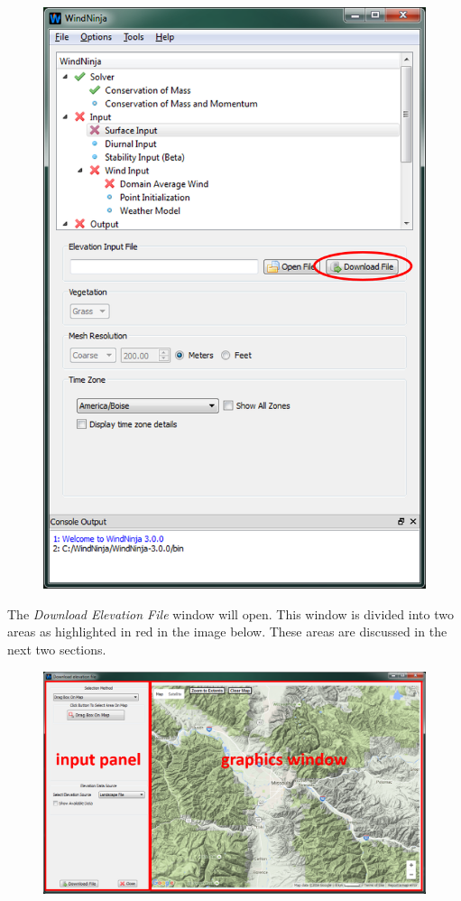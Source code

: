 \documentclass[12pt]{article}
\begin{document}
\begin{figure}[H]
	\centering
	\label{}
	\includegraphics[scale=0.75]{main_window_0}
\end{figure}
\newpage

The \textit{Download Elevation File} window will open.  This window is divided into two areas as highlighted in red in the image below.  These areas are discussed in the next two sections.

\begin{figure}[H]
	\centering
	\label{}
	\includegraphics[scale=0.75]{dem_download_1}
\end{figure}
\end{document}
